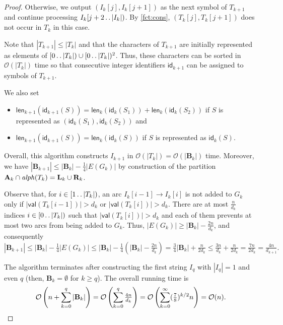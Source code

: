 \documentclass[a4paper]{article}
\theoremstyle{definition}
\theoremstyle{remark}
\newcommand{\B}{\mathbf{B}}
\newcommand{\dd}{\mathinner{\ldotp\ldotp}}
\newcommand{\val}{\mathsf{val}}
\newcommand{\aalph}{\mathit{alph}}
\newcommand{\Oh}{\mathcal{O}}
\newcommand{\id}{\mathsf{id}}
\newcommand{\len}{\mathsf{len}}
\begin{document}
\begin{proof}
Otherwise, we output $(I_{k}[j],I_{k}[j+1])$ as the next symbol of $T_{k+1}$ and continue processing $I_{k}[j+2\dd |I_{k}|)$.
By \cref{fct:cons}, $(T_{k}[j],T_{k}[j+1])$ does not occur in $T_{k}$ in this case.

Note that $|T_{k+1}|\le |T_{k}|$ and that the characters of $T_{k+1}$ are initially represented as elements of $[0\dd |T_{k}|)\cup [0\dd |T_{k}|)^2$.
Thus, these characters can be sorted in $\Oh(|T_{k}|)$ time so that consecutive integer identifiers $\id_{k+1}$ can be assigned to symbols of $T_{k+1}$. 

We also set 

\begin{itemize}
\item
$\len_{k+1}(\id_{k+1}(S))=\len_{k}(\id_{k}(S_1))+\len_{k}(\id_{k}(S_2))$ if $S$ is represented as $(\id_{k}(S_1),\id_{k}(S_2))$ and 

\item
$\len_{k+1}(\id_{k+1}(S))=\len_{k}(\id_{k}(S))$ if $S$ is represented as $\id_{k}(S)$.
\end{itemize}

Overall, this algorithm constructs $I_{k+1}$ in $\Oh(|T_{k}|) = \Oh(|\B_{k}|)$ time.
Moreover, we have $|\B_{k+1}| \le |\B_{k}|-\tfrac14 |E(G_{k})|$ by construction of the partition $\Act_{k}\cap \aalph(T_k) = \Left_{k} \cup \Right_{k}$.

Observe that, for $i\in [1\dd |T_{k}|)$, an arc  $I_{k}[i-1]\to I_{k}[i]$ is not added to $G_{k}$ 
only if 
$|\val(T_{k}[i-1])| > d_{k}$ or $|\val(T_{k}[i])| > d_{k}$.
There are at most $\frac{n}{d_{k}}$ indices $i\in [0\dd |T_{k}|)$ such that $|\val(T_{k}[i])| > d_{k}$ and each of them prevents at most two arcs from being added to $G_{k}$.
Thus, $|E(G_{k})| \ge |\B_{k}| - \frac{2n}{d_{k}}$, and consequently 
\[|\B_{k+1}| \le |\B_{k}|-\tfrac14 |E(G_{k})| 
\le |\B_{k}| - \tfrac14\left(|\B_{k}| - \tfrac{2n}{d_{k}}\right)
  = \tfrac34|\B_{k}| + \tfrac{n}{2d_{k}}  \le \tfrac{3n}{d_{k}} + \tfrac{n}{2d_{k}} = \tfrac{7n}{2d_{k}}  = \tfrac{4n}{d_{k+1}}.\]

The algorithm terminates after constructing the first string $I_q$ with $|I_q|=1$ and even $q$ (then, $\B_k=\emptyset$ for $k \ge q$). The overall running time is 
\[\Oh\left(n+\sum_{k=0}^q |\B_k|\right)=\Oh\left(\sum_{k=0}^q \tfrac{4n}{d_{k}}\right)=\Oh\left(\sum_{k=0}^\infty (\tfrac{7}{8})^{k/2}n\right) = \Oh(n).\qedhere \]
\end{proof}
\end{document}
